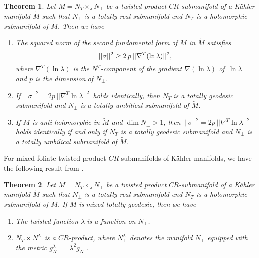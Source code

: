 \documentclass{amsart}
\theoremstyle{plain}
\newtheorem{theorem}{Theorem}[section]
\numberwithin{equation}{section}
\theoremstyle{remark}
\numberwithin{equation}{section}
\begin{document}
\begin{theorem}\label{T:18.2} Let $M=N_T\times_\lambda N_\perp$ be a  twisted product $CR$-submanifold of a K\"ahler manifold $\tilde M$ such that $N_\perp$ is a totally real submanifold
and $N_T$ is a holomorphic submanifold of $\tilde M$. Then we have

\begin{enumerate}
\item The squared norm of the second fundamental form of $M$ in $\tilde M$ satisfies
\begin{equation}\notag ||\sigma||^2\geq 2\, p\, ||\nabla^T(\ln\lambda)||^2,\end{equation}
where $\nabla^T(\ln\lambda)$ is the $N^T$-component of the gradient $\nabla(\ln \lambda)$ of $\,\ln\lambda$ and $p$ is the dimension of $N_\perp$.

\item If $\,||\sigma||^2= 2p\,||\nabla^T\ln\lambda ||^2\,$ holds identically, then $N_T$ is a
totally geodesic submanifold and $N_\perp$ is a totally umbilical  submanifold of $\tilde M$.

\item If $M$ is anti-holomorphic in $\tilde M$ and $\dim N_\perp>1$, then  $\,||\sigma||^2=
2p\,{||\nabla^T\ln\lambda ||^2}\,$ holds identically if and only if $N_T$ is a
totally geodesic  submanifold and $N_\perp$ is a totally umbilical submanifold of $\tilde M$.
\end{enumerate}\end{theorem}

 For mixed foliate twisted product $CR$-submanifolds of K\"ahler manifolds, we have the following result from \cite{c5.1}.

\begin{theorem}\label{18.3} Let $M=N_T\times_\lambda N_\perp$ be a twisted product $CR$-submanifold of a K\"ahler manifold $\tilde M$ such that $N_\perp$ is a totally real submanifold and $N_T$ is a holomorphic submanifold of $\tilde M$. If $M$ is mixed totally geodesic, then we have

\begin{enumerate}
\item The twisted function $\lambda$ is a function on $N_\perp$. 

\item  $N_T\times N^\lambda_\perp$ is a $CR$-product, where $N^\lambda_\perp$ denotes the
manifold $N_\perp$ equipped with the metric $g_{N_\perp}^\lambda=\lambda^2 g_{N_\perp}$.
\end{enumerate}\end{theorem}
\end{document}
